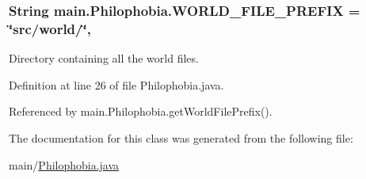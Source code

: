 \hypertarget{classmain_1_1_philophobia_a7502fe9b6042326072c5be7be632cc6c}{
\subsubsection[{W\-O\-R\-L\-D\-\_\-\-F\-I\-L\-E\-\_\-\-P\-R\-E\-F\-I\-X}]{\setlength{\rightskip}{0pt plus 5cm}String main.\-Philophobia.\-W\-O\-R\-L\-D\-\_\-\-F\-I\-L\-E\-\_\-\-P\-R\-E\-F\-I\-X = \char`\"{}src/world/\char`\"{}\hspace{0.3cm}{\ttfamily [static]}, {\ttfamily [protected]}}}\label{classmain_1_1_philophobia_a7502fe9b6042326072c5be7be632cc6c}


Directory containing all the world files. 



Definition at line 26 of file Philophobia.\-java.



Referenced by main.\-Philophobia.\-get\-World\-File\-Prefix().



The documentation for this class was generated from the following file\-:\begin{DoxyCompactItemize}
\item 
main/\hyperlink{_philophobia_8java}{Philophobia.\-java}\end{DoxyCompactItemize}
